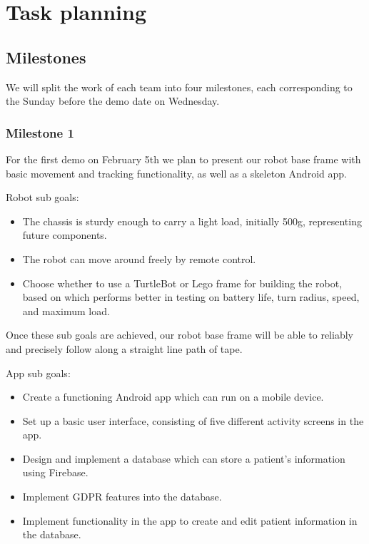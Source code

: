 \documentclass{article}
\begin{document}
\section{Task planning}

\subsection{Milestones} 
We will split the work of each team into four milestones, each corresponding to the Sunday before the demo date on Wednesday. 

\subsubsection{Milestone 1}
For the first demo on February 5th we plan to present our robot base frame with basic movement and tracking functionality, as well as a skeleton Android app.

Robot sub goals:
\begin{itemize}
\item The chassis is sturdy enough to carry a light load, initially 500g, representing future components. %
\item The robot can move around freely by remote control.
\item Choose whether to use a TurtleBot or Lego frame for building the robot, based on which performs better in testing on battery life, turn radius, speed, and maximum load. 
\end{itemize}


Once these sub goals are achieved, our robot base frame will be able to reliably and precisely follow along a straight line path of tape. 

App sub goals:
\begin{itemize}
\item Create a functioning Android app which can run on a mobile device. %
\item Set up a basic user interface, consisting of five different activity screens in the app. 
\item Design and implement a database which can store a patient's information using Firebase.
\item Implement GDPR features into the database. %
\item Implement functionality in the app to create and edit patient information in the database.
\end{itemize}
\end{document}
